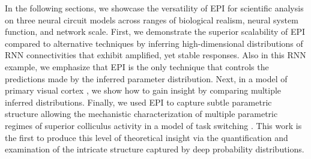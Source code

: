 \documentclass[11pt]{article}
\begin{document}
In the following sections, we showcase the versatility of EPI for scientific analysis on three neural circuit models across ranges of biological realism, neural system function, and network scale.
First, we demonstrate the superior scalability of EPI compared to alternative techniques by inferring high-dimensional distributions of RNN connectivities that exhibit amplified, yet stable responses.
Also in this RNN example, we emphasize that EPI is the only technique that controls the predictions made by the inferred parameter distribution.
Next, in a model of primary visual cortex \cite{litwin2016inhibitory, palmigiano2020structure}, we show how to gain insight by comparing multiple inferred distributions.
Finally, we used EPI to capture subtle parametric structure allowing the mechanistic characterization of multiple parametric regimes of superior colliculus activity in a model of task switching \cite{duan2018collicular}.
This work is the first to produce this level of theoretical insight via the quantification and examination of the intricate structure captured by deep probability distributions.
\end{document}
